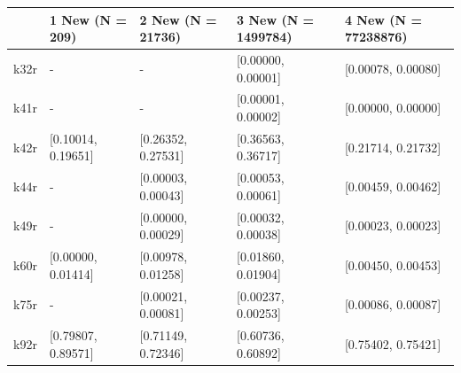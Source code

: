 \begin{tabular}{lllll}
\toprule
 & 1 New (N = 209) & 2 New (N = 21736) & 3 New (N = 1499784) & 4 New (N = 77238876) \\
\midrule
k32r & - & - & [0.00000, 0.00001] & [0.00078, 0.00080] \\
k41r & - & - & [0.00001, 0.00002] & [0.00000, 0.00000] \\
k42r & [0.10014, 0.19651] & [0.26352, 0.27531] & [0.36563, 0.36717] & [0.21714, 0.21732] \\
k44r & - & [0.00003, 0.00043] & [0.00053, 0.00061] & [0.00459, 0.00462] \\
k49r & - & [0.00000, 0.00029] & [0.00032, 0.00038] & [0.00023, 0.00023] \\
k60r & [0.00000, 0.01414] & [0.00978, 0.01258] & [0.01860, 0.01904] & [0.00450, 0.00453] \\
k75r & - & [0.00021, 0.00081] & [0.00237, 0.00253] & [0.00086, 0.00087] \\
k92r & [0.79807, 0.89571] & [0.71149, 0.72346] & [0.60736, 0.60892] & [0.75402, 0.75421] \\
\bottomrule
\end{tabular}
